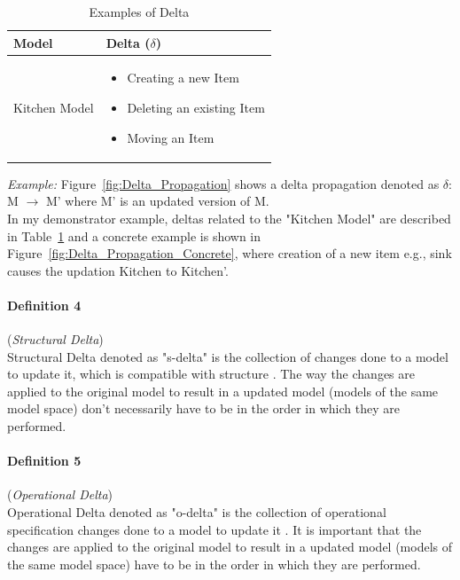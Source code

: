 \begin{table}
	\centering	
	\begin{tabular}{|p{5cm}|p{10cm}|}
		\hline
		\rowcolor[gray]{.8}	
		\textbf{Model} & \textbf{Delta ($\delta$)} \\
		\hline
		Kitchen Model & 
		\begin{itemize}
			\item Creating a new Item
			\item Deleting an existing Item
			\item Moving an Item
		\end{itemize}\\
		\hline				
		
	\end{tabular}
	\label{tab:Examples_of_Delta}
	\caption{Examples of Delta}
\end{table}

\textit{Example:} Figure~\ref{fig:Delta_Propagation} shows a delta propagation denoted as $\delta$: M $\longrightarrow$ M' where M' is an updated version of M.\\
In my demonstrator example, deltas related to the "Kitchen Model" are described in Table~\ref{tab:Examples_of_Delta} and a concrete example is shown in Figure~\ref{fig:Delta_Propagation_Concrete}, where creation of a new item e.g., sink causes the updation Kitchen to Kitchen'.

\paragraph{Definition 4} (\textit{Structural Delta})\\ 
Structural Delta denoted as "s-delta" is the collection of changes done to a model to update it, which is compatible with structure \cite{benchmarx-reload}. The way the changes are applied to the original model to result in a updated model (models of the same model space) don't necessarily have to be in the order in which they are performed. 

\paragraph{Definition 5} (\textit{Operational Delta})\\  
Operational Delta denoted as "o-delta" is the collection of operational specification changes done to a model to update it \cite{benchmarx-reload}. It is important that the changes are applied to the original model to result in a updated model (models of the same model space) have to be in the order in which they are performed. 

